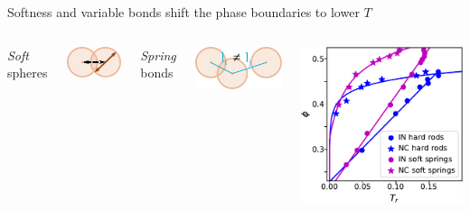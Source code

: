 \documentclass[aspectratio=169]{beamer}
\begin{document}
\begin{frame}[c]{Softness and variable bonds shift the phase boundaries to lower $T$}
\begin{columns}[T]
\begin{columns}[T]
      \centering
      \textcolor{FigGreen}{\Large \emph{Soft} spheres}
      \vspace{0.5\baselineskip}

      \includegraphics[scale=0.65]{../figures/fig-all_potentials/fig-pairs/fig-pair_soft.pdf}


      \centering
      \textcolor{FigOrange}{\Large \emph{Spring} bonds}
      \vspace{0.5\baselineskip}

      \includegraphics[scale=0.65]{../figures/fig-all_potentials/fig-bonds/fig-bond_spring.pdf}

    \end{columns}

    \centering
    \vspace{0.5\baselineskip}

    \includegraphics[]{../figures/ch5_soft/soft_vs_hard/fig-phase_diag.pdf}

  \end{columns}
\end{frame}
\end{document}
